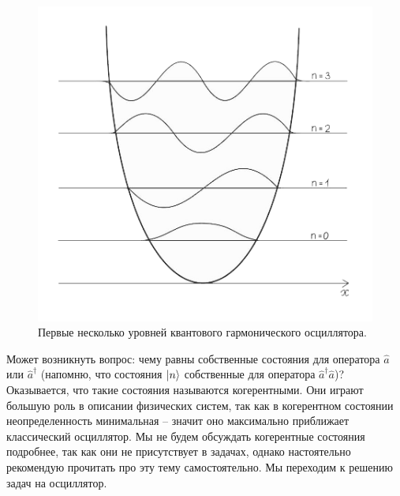 \begin{figure}[h!]
\centering
\includegraphics[scale=0.4]{class 6/images/oscillator.png}
\caption{Первые несколько уровней квантового гармонического осциллятора.}
\label{fig 6.8}
\end{figure}
\newpage
Может возникнуть вопрос: чему равны собственные состояния для оператора $\hat{a}$ или $\hat{a}^{\dagger}$ (напомню, что состояния $\ket{n}$ собственные для оператора $\hat{a}^{\dagger}\hat{a}$)? Оказывается, что такие состояния называются когерентными. Они играют большую роль в описании физических систем, так как в когерентном состоянии неопределенность минимальная – значит оно максимально приближает классический осциллятор. Мы не будем обсуждать когерентные состояния подробнее, так как они не присутствует в задачах, однако настоятельно рекомендую прочитать про эту тему самостоятельно. Мы переходим к решению задач на осциллятор.


